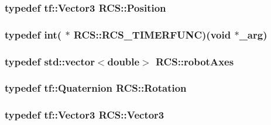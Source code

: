 \hypertarget{namespaceRCS_a6080060b617affc23ab1d6309fe7c3cd}{
\subsubsection[{Position}]{\setlength{\rightskip}{0pt plus 5cm}typedef tf\-::\-Vector3 {\bf R\-C\-S\-::\-Position}}}\label{namespaceRCS_a6080060b617affc23ab1d6309fe7c3cd}
\hypertarget{namespaceRCS_ae5dd02ab24956844fae02f10de954ad5}{
\subsubsection[{R\-C\-S\-\_\-\-T\-I\-M\-E\-R\-F\-U\-N\-C}]{\setlength{\rightskip}{0pt plus 5cm}typedef int( $\ast$ R\-C\-S\-::\-R\-C\-S\-\_\-\-T\-I\-M\-E\-R\-F\-U\-N\-C)(void $\ast$\-\_\-arg)}}\label{namespaceRCS_ae5dd02ab24956844fae02f10de954ad5}
\hypertarget{namespaceRCS_a3185cefb4d61f5c6f364aaf5624a3ee4}{
\subsubsection[{robot\-Axes}]{\setlength{\rightskip}{0pt plus 5cm}typedef std\-::vector$<$double$>$ {\bf R\-C\-S\-::robot\-Axes}}}\label{namespaceRCS_a3185cefb4d61f5c6f364aaf5624a3ee4}
\hypertarget{namespaceRCS_a3fd915276fdb632d217c560523c320e0}{
\subsubsection[{Rotation}]{\setlength{\rightskip}{0pt plus 5cm}typedef tf\-::\-Quaternion {\bf R\-C\-S\-::\-Rotation}}}\label{namespaceRCS_a3fd915276fdb632d217c560523c320e0}
\hypertarget{namespaceRCS_a688a9db9f1e17b76c410c539997d07a7}{
\subsubsection[{Vector3}]{\setlength{\rightskip}{0pt plus 5cm}typedef tf\-::\-Vector3 {\bf R\-C\-S\-::\-Vector3}}}\label{namespaceRCS_a688a9db9f1e17b76c410c539997d07a7}


